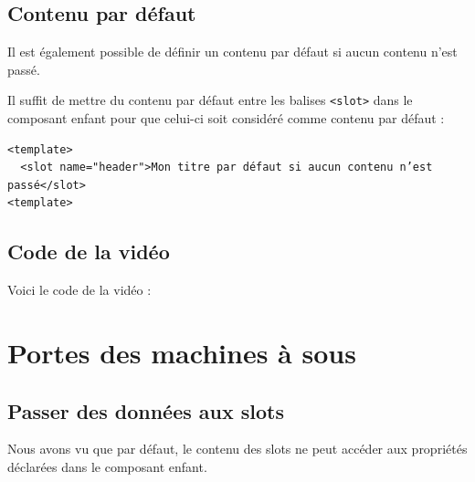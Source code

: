 \subsection{Contenu par défaut}
Il est également possible de définir un contenu par défaut si aucun contenu n'est passé.

Il suffit de mettre du contenu par défaut entre les balises {\tt <slot>} dans le composant enfant pour que celui-ci soit considéré comme contenu par défaut :
\begin{verbatim}
<template>
  <slot name="header">Mon titre par défaut si aucun contenu n’est passé</slot>
<template>
\end{verbatim}
\subsection{Code de la vidéo}
Voici le code de la vidéo :


\section{Portes des machines à sous}
\subsection{Passer des données aux slots}
Nous avons vu que par défaut, le contenu des {\color{monOrange}slots} ne peut accéder aux propriétés déclarées dans le composant enfant.

